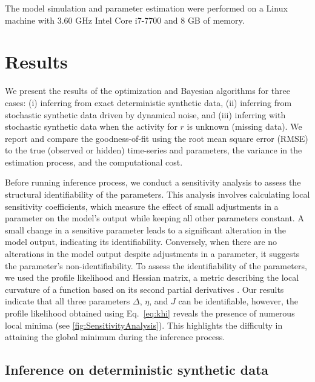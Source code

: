 \documentclass[preprint,11pt,authoryear]{elsarticle}
\begin{document}
The model simulation and parameter estimation were performed on a Linux machine with 3.60 GHz Intel Core i7-7700 and 8 GB of memory.






\section{Results}
\label{Results}

We present the results of the optimization and Bayesian algorithms for three cases: (i) inferring from exact deterministic synthetic data, (ii) inferring from stochastic synthetic data driven by dynamical noise, and (iii) inferring with stochastic synthetic data when the activity for $r$ is unknown (missing data).  We report and compare the goodness-of-fit using the root mean square error (RMSE) to the true (observed or hidden) time-series and parameters, the variance in the estimation process, and the computational cost.



Before running inference process, we conduct a sensitivity analysis to assess the structural identifiability of the parameters. This analysis involves calculating local sensitivity coefficients, which measure the effect of small adjustments in a parameter on the model's output while keeping all other parameters constant. A small change in a sensitive parameter leads to a significant alteration in the model output, indicating its identifiability. Conversely, when there are no alterations in the model output despite adjustments in a parameter, it suggests the parameter's non-identifiability. To assess the identifiability of the parameters, we used the profile likelihood \citep{Raue2009, Wieland2021} and Hessian matrix, a metric describing the local curvature of a function based on its second partial derivatives \citep{Hashemi2018, Hashemi2023}. Our results indicate that all three parameters $\Delta$, $\eta$, and $J$ can be identifiable, however, the profile likelihood obtained using Eq.~\ref{eq:khi} reveals the presence of numerous local minima (see \autoref{fig:SensitivityAnalysis}). This highlights the difficulty in attaining the global minimum during the inference process.



\subsection{Inference on deterministic synthetic data}
\end{document}
